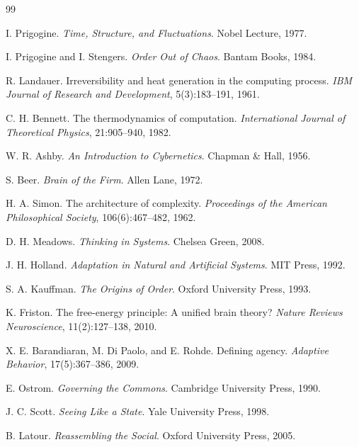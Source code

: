 \documentclass[12pt,oneside]{book}
\begin{document}
\newpage
\begin{thebibliography}{99}

I. Prigogine.
\newblock \emph{Time, Structure, and Fluctuations}.
\newblock Nobel Lecture, 1977.

I. Prigogine and I. Stengers.
\newblock \emph{Order Out of Chaos}.
\newblock Bantam Books, 1984.

R. Landauer.
\newblock Irreversibility and heat generation in the computing process.
\newblock \emph{IBM Journal of Research and Development}, 5(3):183--191, 1961.

C. H. Bennett.
\newblock The thermodynamics of computation.
\newblock \emph{International Journal of Theoretical Physics}, 21:905--940, 1982.

W. R. Ashby.
\newblock \emph{An Introduction to Cybernetics}.
\newblock Chapman \& Hall, 1956.

S. Beer.
\newblock \emph{Brain of the Firm}.
\newblock Allen Lane, 1972.

H. A. Simon.
\newblock The architecture of complexity.
\newblock \emph{Proceedings of the American Philosophical Society}, 106(6):467--482, 1962.

D. H. Meadows.
\newblock \emph{Thinking in Systems}.
\newblock Chelsea Green, 2008.

J. H. Holland.
\newblock \emph{Adaptation in Natural and Artificial Systems}.
\newblock MIT Press, 1992.

S. A. Kauffman.
\newblock \emph{The Origins of Order}.
\newblock Oxford University Press, 1993.

K. Friston.
\newblock The free-energy principle: A unified brain theory?
\newblock \emph{Nature Reviews Neuroscience}, 11(2):127--138, 2010.

X. E. Barandiaran, M. Di Paolo, and E. Rohde.
\newblock Defining agency.
\newblock \emph{Adaptive Behavior}, 17(5):367--386, 2009.

E. Ostrom.
\newblock \emph{Governing the Commons}.
\newblock Cambridge University Press, 1990.

J. C. Scott.
\newblock \emph{Seeing Like a State}.
\newblock Yale University Press, 1998.

B. Latour.
\newblock \emph{Reassembling the Social}.
\newblock Oxford University Press, 2005.


\end{thebibliography}
\end{document}
